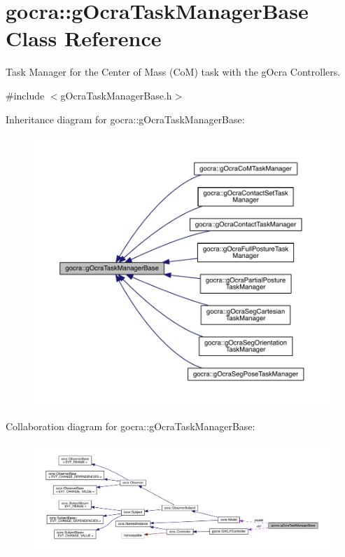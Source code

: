 \hypertarget{classgocra_1_1gOcraTaskManagerBase}{}\section{gocra\+:\+:g\+Ocra\+Task\+Manager\+Base Class Reference}
\label{classgocra_1_1gOcraTaskManagerBase}


Task Manager for the Center of Mass (CoM) task with the g\+Ocra Controllers.  




{\ttfamily \#include $<$g\+Ocra\+Task\+Manager\+Base.\+h$>$}



Inheritance diagram for gocra\+:\+:g\+Ocra\+Task\+Manager\+Base\+:\nopagebreak
\begin{figure}[H]
\begin{center}
\leavevmode
\includegraphics[width=350pt]{da/dd1/classgocra_1_1gOcraTaskManagerBase__inherit__graph}
\end{center}
\end{figure}


Collaboration diagram for gocra\+:\+:g\+Ocra\+Task\+Manager\+Base\+:\nopagebreak
\begin{figure}[H]
\begin{center}
\leavevmode
\includegraphics[width=350pt]{da/d7b/classgocra_1_1gOcraTaskManagerBase__coll__graph}
\end{center}
\end{figure}
